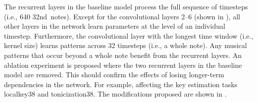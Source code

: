 
The recurrent layers in the baseline model process the full
sequence of timesteps (i.e., 640 \gls{32nd}~notes). Except
for the convolutional layers 2--6 (shown in
), all other layers
in the network learn parameters at the level of an
individual timestep. Furthermore, the convolutional layer
with the longest time window (i.e., kernel size) learns
patterns across 32 timesteps (i.e., a \gls{whole} note). Any
musical patterns that occur beyond a \gls{whole} note
benefit from the recurrent layers. An ablation experiment is
proposed where the two recurrent layers in the baseline
model are removed. This should confirm the effects of losing
longer-term dependencies in the network. For example,
affecting the key estimation tasks \gls{localkey38} and
\gls{tonicization38}. The modifications proposed are shown
in .

